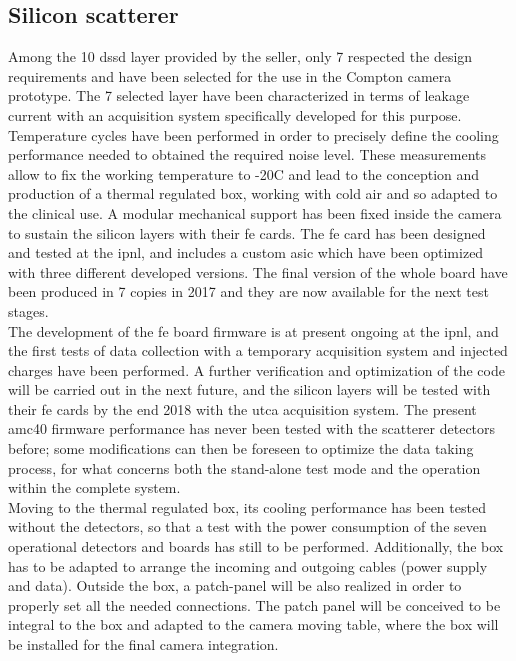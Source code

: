 \subsection{Silicon scatterer}\label{chap3::subsec::scattNext}
Among the 10 \gls{dssd} layer provided by the seller, only 7 respected the design requirements and have been selected for the use in the Compton camera prototype. The 7 selected layer have been characterized in terms of leakage current with an acquisition system specifically developed for this purpose. Temperature cycles have been performed in order to precisely define the cooling performance needed to obtained the required noise level. These measurements allow to fix the working temperature to -20\textdegree{}C and lead to the conception and production of a thermal regulated box, working with cold air and so adapted to the clinical use. A modular mechanical support has been fixed inside the camera to sustain the silicon layers with their \gls{fe} cards. The \gls{fe} card has been designed and tested at the \gls{ipnl}, and includes a custom \gls{asic} which have been optimized with three different developed versions. The final version of the whole board have been produced in 7 copies in 2017 and they are now available for the next test stages.\\
The development of the \gls{fe} board firmware is at present ongoing at the \gls{ipnl}, and the first tests of data collection with a temporary acquisition system and injected charges have been performed. A further verification and optimization of the code will be carried out in the next future, and the silicon layers will be tested with their \gls{fe} cards by the end 2018 with the \gls{utca} acquisition system. The present \gls{amc}40 firmware performance has never been tested with the scatterer detectors before; some modifications can then be foreseen to optimize the data taking process, for what concerns both the stand-alone test mode and the operation within the complete system.\\ Moving to the thermal regulated box, its cooling performance has been tested without the detectors, so that a test with the power consumption of the seven operational detectors and boards has still to be performed. Additionally, the box has to be adapted to arrange the incoming and outgoing cables (power supply and data). Outside the box, a patch-panel will be also realized in order to properly set all the needed connections. The patch panel will be conceived to be integral to the box and adapted to the camera moving table, where the box will be installed for the final camera integration.\\
